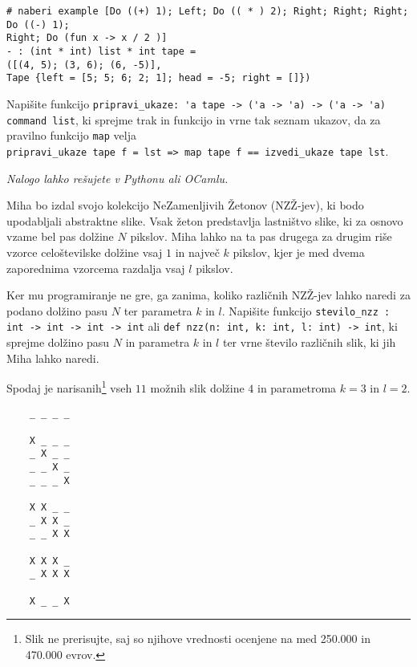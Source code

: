 \documentclass[arhiv]{../izpit}
\begin{document}
\begin{verbatim}
# naberi example [Do ((+) 1); Left; Do (( * ) 2); Right; Right; Right; Do ((-) 1); 
Right; Do (fun x -> x / 2 )]
- : (int * int) list * int tape =
([(4, 5); (3, 6); (6, -5)],
Tape {left = [5; 5; 6; 2; 1]; head = -5; right = []})
\end{verbatim}

\podnaloga
Napišite funkcijo \verb|pripravi_ukaze: 'a tape -> ('a -> 'a) -> ('a -> 'a) command list|, ki sprejme trak in funkcijo in vrne tak seznam ukazov, da za pravilno funkcijo \verb|map| velja \\
\verb|pripravi_ukaze tape f = lst => map tape f == izvedi_ukaze tape lst|.



\naloga

\emph{Nalogo lahko rešujete v Pythonu ali OCamlu.}

Miha bo izdal svojo kolekcijo NeZamenljivih Žetonov (NZŽ-jev), ki bodo upodabljali abstraktne slike.
Vsak žeton predstavlja lastništvo slike, ki za osnovo vzame bel pas dolžine $N$ pikslov. 
Miha lahko na ta pas drugega za drugim riše vzorce celoštevilske dolžine vsaj $1$ in največ $k$ pikslov, kjer je med dvema zaporednima vzorcema razdalja vsaj $l$ pikslov.

  Ker mu programiranje ne gre, ga zanima, koliko različnih NZŽ-jev lahko naredi za podano dolžino pasu $N$ ter parametra $k$ in $l$.
  Napišite funkcijo \verb|stevilo_nzz : int -> int -> int -> int| ali \verb|def nzz(n: int, k: int, l: int) -> int|, ki sprejme dolžino pasu $N$ in parametra $k$ in $l$ ter vrne število različnih slik, ki jih Miha lahko naredi.

Spodaj je narisanih\footnote{Slik ne prerisujte, saj so njihove vrednosti ocenjene na med 250.000 in 470.000 evrov.} vseh $11$ možnih slik dolžine $4$ in parametroma $k = 3$ in $l = 2$.
\begin{verbatim}
    _ _ _ _
    
    X _ _ _
    _ X _ _
    _ _ X _
    _ _ _ X
    
    X X _ _
    _ X X _
    _ _ X X
    
    X X X _
    _ X X X
    
    X _ _ X
\end{verbatim}
\end{document}
